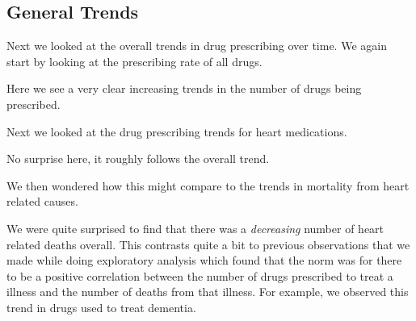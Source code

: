 \documentclass[a4paper]{article}
\begin{document}


	\subsection{General Trends}
		Next we looked at the overall trends in drug prescribing over time. We again 
		start by looking at the prescribing rate of all drugs. 

		Here we see a very clear increasing trends in the number of drugs being prescribed.


		Next we looked at the drug prescribing trends for heart medications. 

		No surprise here, it roughly follows the overall trend. 

		We then wondered how this might compare to the trends in mortality from 
		heart related causes. 

		We were quite surprised to find that there was a \emph{decreasing} number of 
		heart related deaths overall. This contrasts quite a bit to previous observations
		that we made while doing exploratory analysis which found that the norm was
		for there to be a positive correlation between the number of drugs prescribed to 
		treat a illness and the number of deaths from that illness. For example, 
		we observed this trend in drugs used to treat dementia.



\end{document}
